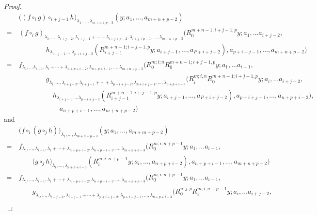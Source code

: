 \documentclass[a4paper,reqno,10pt]{amsart}
\theoremstyle{plain}
\theoremstyle{definition}
\theoremstyle{remark}
\newcommand{\la}{\lambda}
\begin{document}
\begin{proof}
\begin{align} \label{eqi-1}
  & \big((f \circ_{i}g)\circ_{i+j-1} h \big)_{\la_{1}, \ldots, \la_{m+n+p-3}}(y; a_{1}, \ldots ,a_{m+n+p-2}) \nonumber \\
=~ & (f \circ _{i} g)_{\la_{1}, \ldots ,\la_{i+j-2},\la_{i+j-1}+ \cdots + \la_{i+j+p-2},\la_{i+j+p-1}, \ldots , \la_{m+n+p-3} } \big(R_{0}^{m+n-1;i+j-1,p}y;a_{1}, \ldots a_{i+j-2}, \nonumber \\
  & \qquad \qquad  h_{\la_{i+j-1}, \ldots \la_{p+i+j-3}}(R_{i+j-1}^{m+n-1;i+j-1,p}y;a_{i+j-1}, \ldots, a_{P+i+j-2}),a_{p+i+j-1},\ldots, a_{m+n+p-2} \big) \nonumber \\
 =~ & f_{\la_{1}, \ldots \la_{i-1},\la_{i} + \cdots + \la_{n+p+i-2},\la_{n+p+i-1}, \ldots ,\la_{m+n+p-3} }\big(R_{0}^{m;i;n}R_{0}^{m+n-1;i+j-1,p}y;a_{1}, \ldots a_{i-1}, \nonumber \\
  &  \qquad \qquad  g_{\la_{i}, \ldots , \la_{i+j-2}, \la_{i+j-1}+ \cdots +\la_{p+i+j-2}, \la_{p+i+j-1},\ldots, \la_{n+p+i-3}}\big(R_{i}^{m;i,n}R_{0}^{m+n-1;i+j-1,p}y; a_{i},\ldots a_{i+j-2}, \nonumber \\
  &  \qquad \qquad \quad h_{\la_{i+j-1}, \ldots \la_{p+i+j-3}}(R_{i+j-1}^{m+n-1;i+j-1,p}y;a_{i+j-1}, \ldots, a_{P+i+j-2}),a_{p+i+j-1}, \ldots , a_{n+p+i-2} \big), \nonumber \\
  &  \qquad \qquad \quad \quad  a_{n+p+i-1}, \ldots  , a_{m+n+p-2} \big)
\end{align}
  and
  \begin{align*} 
    & \big( f \circ _{i}(g \circ _{j}h) \big)_{\la_{1}, \ldots , \la_{m+n+p-3}} (y;a_{1}, \ldots , a_{m+m+p-2}) \nonumber \\
    =~ & f_{\la_{1}, \ldots , \la_{i-1},\la_{i}+\cdots + \la_{n+p+i-2},\la_{n+p+i-1},\ldots , \la_{m+n+p-3}} \big( R_{0}^{m;i,n+p-1}y;a_{1}, \ldots a_{i-1}, \nonumber \\
     & \qquad \big(g \circ _{j} h \big)_{\la_{i}, \ldots , \la _{n+p+i-3}}(R_{i}^{m;i,n+p-1}y;a_{i}, \ldots , a_{n+p+i-2}), a_{n+p+i-1}, \ldots , a_{m+n+p-2} \big) \nonumber 
     \end{align*}
     \begin{align}\label{eqi-2}
    =~ & f_{\la_{1}, \ldots , \la_{i-1},\la_{i}+\cdots + \la_{n+p+i-2},\la_{n+p+i-1},\ldots , \la_{m+n+p-3}} \big( R_{0}^{m;i,n+p-1}y;a_{1}, \ldots a_{i-1}, \nonumber \\
    & \qquad g_{\la_{i}, \ldots , \la_{i+j-2}, \la_{i+j-1}+ \cdots +\la_{p+i+j-2}, \la_{p+i+j-1},\ldots, \la_{n+p+i-3}} \big( R_{0}^{n;j,p}R_{i}^{m;i,n+p-1}y; a_{i},\ldots a_{i+j-2}, \nonumber \\

\end{align}
\end{proof}
\end{document}
